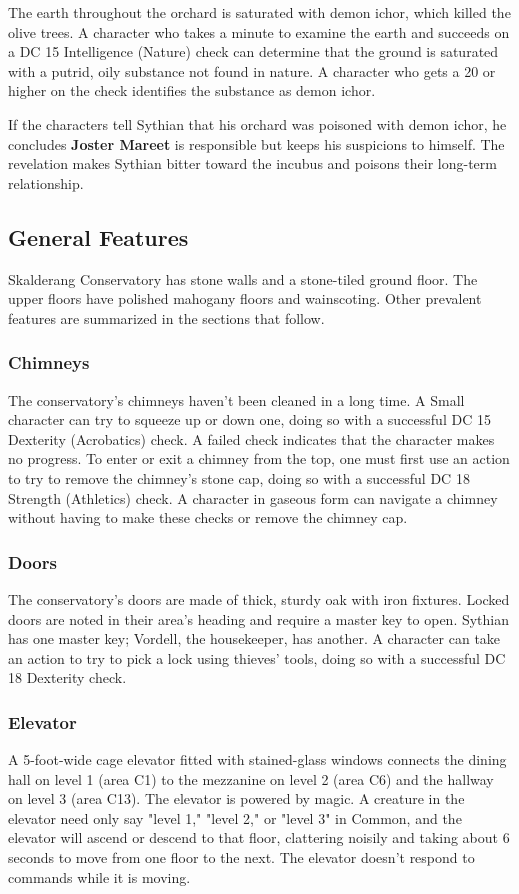 \documentclass[10pt,a4paper,twoside,bg=print,twocolumn,openany,nodeprecatedcode]{dndbook}
\begin{document}
The earth throughout the orchard is saturated with demon ichor, which killed the olive trees. A character who takes a minute to examine the earth and succeeds on a DC 15 Intelligence (Nature) check can determine that the ground is saturated with a putrid, oily substance not found in nature. A character who gets a 20 or higher on the check identifies the substance as demon ichor.

If the characters tell Sythian that his orchard was poisoned with demon ichor, he concludes \textbf{Joster Mareet} is responsible but keeps his suspicions to himself. The revelation makes Sythian bitter toward the incubus and poisons their long-term relationship.

\subsection{General Features}
Skalderang Conservatory has stone walls and a stone-tiled ground floor. The upper floors have polished mahogany floors and wainscoting. Other prevalent features are summarized in the sections that follow.

\subsubsection{Chimneys}
The conservatory's chimneys haven't been cleaned in a long time. A Small character can try to squeeze up or down one, doing so with a successful DC 15 Dexterity (Acrobatics) check. A failed check indicates that the character makes no progress. To enter or exit a chimney from the top, one must first use an action to try to remove the chimney's stone cap, doing so with a successful DC 18 Strength (Athletics) check. A character in gaseous form can navigate a chimney without having to make these checks or remove the chimney cap.

\subsubsection{Doors}
The conservatory's doors are made of thick, sturdy oak with iron fixtures. Locked doors are noted in their area's heading and require a master key to open. Sythian has one master key; Vordell, the housekeeper, has another. A character can take an action to try to pick a lock using thieves' tools, doing so with a successful DC 18 Dexterity check.

\subsubsection{Elevator}
A 5-foot-wide cage elevator fitted with stained-glass windows connects the dining hall on level 1 (area C1) to the mezzanine on level 2 (area C6) and the hallway on level 3 (area C13). The elevator is powered by magic. A creature in the elevator need only say "level 1," "level 2," or "level 3" in Common, and the elevator will ascend or descend to that floor, clattering noisily and taking about 6 seconds to move from one floor to the next. The elevator doesn't respond to commands while it is moving.
\end{document}
